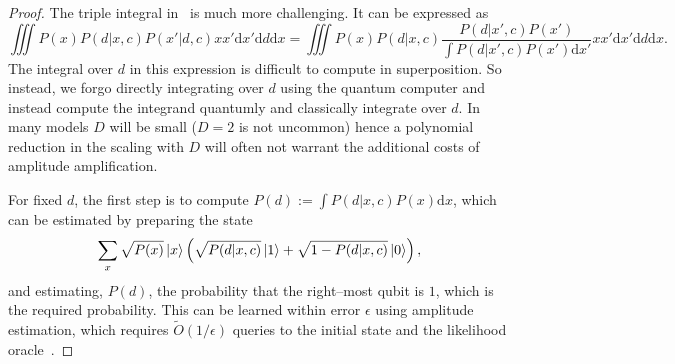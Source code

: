 \documentclass[aps,amsmath,onecolumn,amssymb,notitlepage]{revtex4-1}
\begin{document}
\begin{proof}
The triple integral in~ is much more challenging.  It can be expressed as
\begin{equation}
\iiint P(x) P(d|x,c) P(x'|d,c) xx' \mathrm{d}x' \mathrm{d}d\mathrm{d}x\nonumber = \iiint P(x) P(d|x,c) \frac{P(d|x',c)P(x')}{\int P(d|x',c) P(x')\mathrm{d}x'} xx' \mathrm{d}x' \mathrm{d}d\mathrm{d}x.
\end{equation}
The integral over $d$ in this expression is difficult to compute in superposition.  So instead, we forgo directly integrating over $d$ using the quantum computer and instead compute the integrand quantumly and classically integrate over $d$.  In many models $D$ will be small ($D=2$ is not uncommon) hence a polynomial reduction in the scaling with $D$ will often not warrant the additional costs of amplitude amplification.

For fixed $d$, the first step is to compute $P(d):=\int P(d|x,c) P(x)\mathrm{d}x$, which can be estimated by preparing the state
\begin{equation}
\sum_x \sqrt{P(x)} \left|x\right\rangle \left(\sqrt{{P(d|x,c)}}\left|1\right\rangle + \sqrt{1 -P(d|x,c)}\left|0\right\rangle \right),\label{eq:update1}
\end{equation}
and estimating, $P(d)$, the probability that the right--most qubit is $1$, which is the required probability.   This can be learned within error $\epsilon$ using amplitude estimation, which requires $\tilde{O}(1/\epsilon)$ queries to the initial state and the likelihood oracle~\cite{BHT+00}.



\end{proof}
\end{document}
